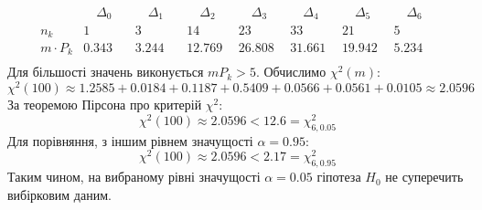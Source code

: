 \documentclass[14pt,a4paper]{scrartcl}
\theoremstyle{definition}
\theoremstyle{remark}
\theoremstyle{definition}
\theoremstyle{definition}
\begin{document}
\[
 \begin{array}{l|c|c|c|c|c|c|c}
   &\quad \Delta_0 \quad&\quad\Delta_1\quad&\quad\Delta_2\quad&\quad\Delta_3\quad&\quad\Delta_4\quad&\quad\Delta_5\quad&\quad\Delta_6\quad\\
   \hline
   n_k&1&3&14&23&33&21&5
   \\\hline
    m \cdot P_k & 0.343&  3.244& 12.769& 26.808& 31.661& 19.942&  5.234\\
 \end{array}
\]
Для більшості значень виконується \( mP_k >5 \). Обчислимо \( \chi^2 (m) \):
\[
 \chi^2 (100) \approx 1.2585 + 0.0184+ 0.1187+ 0.5409+ 0.0566+ 0.0561+ 0.0105 \approx 2.0596
\]
За теоремою Пірсона про критерій \( \chi^2 \):
\[
  \chi^2(100 ) \approx 2.0596 < 12.6 = \chi^2_{6, 0.05}
\]
Для порівняння, з іншим рівнем значущості \( \alpha = 0.95 \):
\[
  \chi^2(100 ) \approx 2.0596 < 2.17 = \chi^2_{6, 0.95}
\]
Таким чином, на вибраному рівні значущості \( \alpha = 0.05 \) гіпотеза \( H_0 \) не суперечить вибірковим даним.
\newpage
\end{document}
